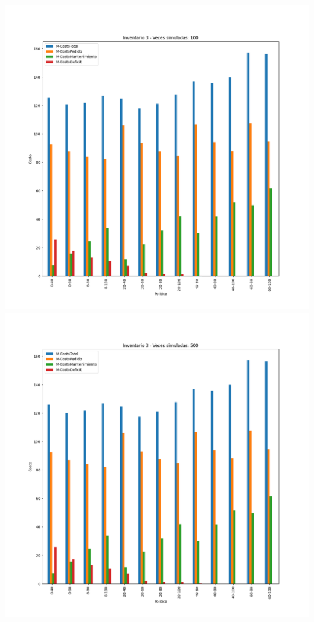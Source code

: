 \documentclass[11pt,a4paper]{report}
\begin{document}
\begin{center}
	\includegraphics[width=0.45\textheight]{img/Cap-2/inventario-3/inventario3-100veces.png}
	\includegraphics[width=0.45\textheight]{img/Cap-2/inventario-3/inventario3-500veces.png}
\end{center}
\end{document}
